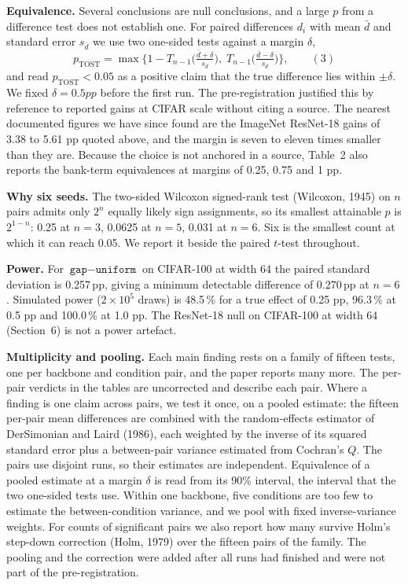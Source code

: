 \documentclass{article}
\begin{document}
\textbf{Equivalence.}  Several conclusions are null conclusions, and a
large $p$ from a difference test does not establish one. For paired
differences $d_i$ with mean $\bar d$ and standard error $s_{\bar d}$ we
use two one-sided tests against a margin $\delta$,
$$p_{\text{TOST}}=\max\Big\{1-T_{n-1}\!\Big(\tfrac{\bar d+\delta}{s_{\bar d}}\Big),\;
T_{n-1}\!\Big(\tfrac{\bar d-\delta}{s_{\bar d}}\Big)\Big\},\qquad(3)$$
and read $p_{\text{TOST}}<0.05$ as a positive claim that the true
difference lies within $\pm\delta$. We fixed $\delta=0.5 pp$ before
the first run. The pre-registration justified this by reference to
reported gains at CIFAR scale without citing a source. The nearest
documented figures we have since found are the ImageNet ResNet-18 gains
of 3.38 to 5.61 pp quoted above, and the margin is seven to
eleven times smaller than they are. Because the choice is not anchored in
a source, Table~2 also reports the bank-term equivalences at
margins of 0.25, 0.75 and 1 pp.

\textbf{Why six seeds.}  The two-sided Wilcoxon signed-rank test
(Wilcoxon, 1945) on $n$ pairs admits only $2^n$ equally likely sign
assignments, so its smallest attainable $p$ is $2^{1-n}$: 0.25 at $n=3$,
0.0625 at $n=5$, 0.031 at $n=6$. Six is the smallest count at which it
can reach 0.05. We report it beside the paired $t$-test throughout.

\textbf{Power.}  For $\texttt{gap}-\texttt{uniform}$ on CIFAR-100 at
width 64 the paired standard deviation is 0.257\,pp, giving a
minimum detectable difference of 0.270\,pp at $n=6$. Simulated
power ($2\times10^5$ draws) is 48.5\,\% for a true effect of
0.25 pp, 96.3\,\% at 0.5 pp and
100.0\,\% at 1.0 pp. The ResNet-18 null on CIFAR-100 at width 64
(Section~6) is not a power artefact.

\textbf{Multiplicity and pooling.}  Each main finding rests on a family
of fifteen tests, one per backbone and condition pair, and the paper
reports many more. The per-pair verdicts in the tables are uncorrected and
describe each pair. Where a finding is one claim across pairs, we test it
once, on a pooled estimate: the fifteen per-pair mean differences are
combined with the random-effects estimator of
DerSimonian and Laird (1986), each weighted by the inverse of its squared
standard error plus a between-pair variance estimated from Cochran's $Q$.
The pairs use disjoint runs, so their estimates are independent.
Equivalence of a pooled estimate at a margin $\delta$ is read from its
90\% interval, the interval that the two one-sided tests use.
Within one backbone, five conditions are too few to estimate the
between-condition variance, and we pool with fixed inverse-variance
weights. For counts of significant pairs we also report how many survive
Holm's step-down correction (Holm, 1979) over the fifteen pairs of the
family. The pooling and the correction were added after all runs had
finished and were not part of the pre-registration.
\end{document}
